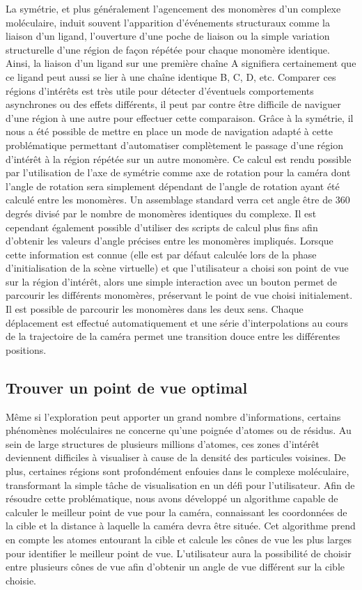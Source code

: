 La symétrie, et plus généralement l'agencement des monomères d'un complexe moléculaire, induit souvent l'apparition d'événements structuraux comme la liaison d'un ligand, l'ouverture d'une poche de liaison ou la simple variation structurelle d'une région de façon répétée pour chaque monomère identique. Ainsi, la liaison d'un ligand sur une première chaîne A signifiera certainement que ce ligand peut aussi se lier à une chaîne identique B, C, D, etc. Comparer ces régions d'intérêts est très utile pour détecter d'éventuels comportements asynchrones ou des effets différents, il peut par contre être difficile de naviguer d'une région à une autre pour effectuer cette comparaison. Grâce à la symétrie, il nous a été possible de mettre en place un mode de navigation adapté à cette problématique permettant d'automatiser complètement le passage d'une région d'intérêt à la région répétée sur un autre monomère. Ce calcul est rendu possible par l'utilisation de l'axe de symétrie comme axe de rotation pour la caméra dont l'angle de rotation sera simplement dépendant de l'angle de rotation ayant été calculé entre les monomères. Un assemblage standard verra cet angle être de 360 degrés divisé par le nombre de monomères identiques du complexe. Il est cependant également possible d'utiliser des scripts de calcul plus fins afin d'obtenir les valeurs d'angle précises entre les monomères impliqués. Lorsque cette information est connue (elle est par défaut calculée lors de la phase d'initialisation de la scène virtuelle) et que l'utilisateur a choisi son point de vue sur la région d'intérêt, alors une simple interaction avec un bouton permet de parcourir les différents monomères, préservant le point de vue choisi initialement. Il est possible de parcourir les monomères dans les deux sens. Chaque déplacement est effectué automatiquement et une série d'interpolations au cours de la trajectoire de la caméra permet une transition douce entre les différentes positions.

\subsection{Trouver un point de vue optimal}

Même si l'exploration peut apporter un grand nombre d'informations, certains phénomènes moléculaires ne concerne qu'une poignée d'atomes ou de résidus. Au sein de large structures de plusieurs millions d'atomes, ces zones d'intérêt deviennent difficiles à visualiser à cause de la densité des particules voisines. De plus, certaines régions sont profondément enfouies dans le complexe moléculaire, transformant la simple tâche de visualisation en un défi pour l'utilisateur. Afin de résoudre cette problématique, nous avons développé un algorithme capable de calculer le meilleur point de vue pour la caméra, connaissant les coordonnées de la cible et la distance à laquelle la caméra devra être située. Cet algorithme prend en compte les atomes entourant la cible et calcule les cônes de vue les plus larges pour identifier le meilleur point de vue. L'utilisateur aura la possibilité de choisir entre plusieurs cônes de vue afin d'obtenir un angle de vue différent sur la cible choisie.

